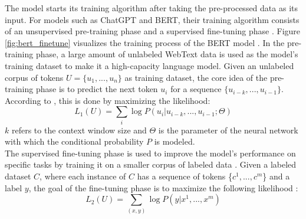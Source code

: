 \documentclass[runningheads]{llncs}
\begin{document}
\noindent \newline
The model starts its training algorithm after taking the pre-processed data as its input. For models such as ChatGPT and BERT, their training algorithm consists of an unsupervised pre-training phase and a supervised fine-tuning phase \cite{Roum23}.
Figure \ref{fig:bert_finetune} visualizes the training process of the BERT model \cite{Devlin18}.
In the pre-training phase, a large amount of unlabeled WebText data is used as the model's training dataset to make it a high-capacity language model. Given an unlabeled corpus of tokens $U=\{u_1,...,u_n\}$ as training dataset, the core idea of the pre-training phase is to 
predict the next token $u_i$ for a sequence $\{u_{i-k},...,u_{i-1}\}$. According to \cite{Radford18}, this is done by maximizing the likelihood: 
\begin{equation}
  L_1(U) = \sum_{i}\log{P(u_i|u_{i-k},...,u_{i-1}; \Theta)}
\end{equation}
$k$ refers to the context window size and $\Theta$ is the parameter of the neural network with which the conditional probability $P$ is modeled. \\
\noindent \newline
The supervised fine-tuning phase is used to improve the model's performance on specific tasks by training it on a smaller corpus of labeled data \cite{Roum23}. Given a labeled dataset $C$,
where each instance of $C$ has a sequence of tokens \{$c^1,...,c^m$\} and a label $y$, the goal of the fine-tuning phase is to maximize the following likelihood \cite{Radford18}:
\begin{equation}
  L_2(U) = \sum_{(x,y)}\log{P(y|x^1,...,x^m)}
\end{equation}
\end{document}
